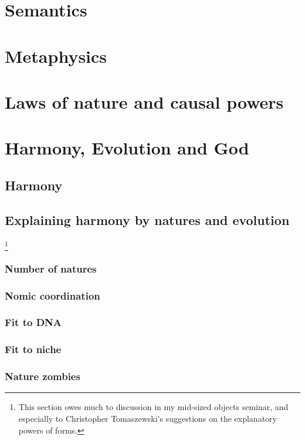 \def\mychapter{V}

\chapter{Semantics}\label{ch:semantics}
\chaptertail

\def\mychapter{VI}

\chapter{Metaphysics}\label{ch:metaphysics}
\chaptertail 

\def\mychapter{VII}

\chapter{Laws of nature and causal powers}\label{ch:laws}
\chaptertail

\def\mychapter{VIII}

\chapter{Harmony, Evolution and God}\label{ch:God}
\section{Harmony}
\section{Explaining harmony by natures and evolution}
\footnote{This section owes much to discussion in my mid-sized objects seminar, and especially to Christopher Tomaszewski's suggestions on the explanatory powers of forms.}
\subsection{Number of natures}
\subsection{Nomic coordination}
\subsection{Fit to DNA}
\subsection{Fit to niche}
\subsection{Nature zombies}
